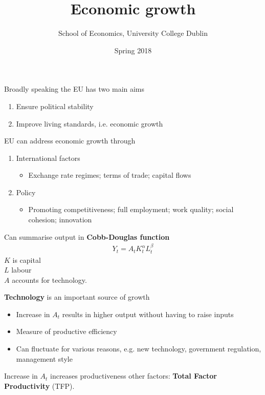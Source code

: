 \documentclass{beamer}
\title{Economic growth}
\author{School of Economics, University College Dublin}
\date{Spring 2018}
\begin{document}
\begin{frame}
 \titlepage
\end{frame}

\begin{frame}
  Broadly speaking the EU has two main aims
  \begin{enumerate}
    \item Ensure political stability
    \item Improve living standards, i.e. economic growth
  \end{enumerate}
\end{frame}

\begin{frame}
  EU can address economic growth through
  \medskip
  \begin{enumerate}
    \item International factors
    \begin{itemize}
      \item Exchange rate regimes; terms of trade; capital flows
    \end{itemize}
    \medskip
    \item Policy
    \begin{itemize}
      \item Promoting competitiveness; full employment; work quality; social cohesion; innovation
    \end{itemize}
  \end{enumerate}
\end{frame}

\begin{frame}
 Can summarise output in \textbf{Cobb-Douglas function}\\ 
\begin{align}
  Y_t=A_tK^{\alpha}_tL^{\beta}_t
\end{align}
$K$ is capital\\
$L$ labour\\
$A$ accounts for technology. 
\end{frame}

\begin{frame}
 \textbf{Technology} is an important source of growth 
\begin{itemize}
  \item Increase in $A_t$ results in higher output without having to raise inputs
  \item Measure of productive efficiency
  \item Can fluctuate for various reasons, e.g. new technology, government regulation, management style
\end{itemize}
 \medskip
  Increase in $A_t$ increases productiveness other factors: \textbf{Total Factor Productivity} (TFP).
\end{frame}
\end{document}
